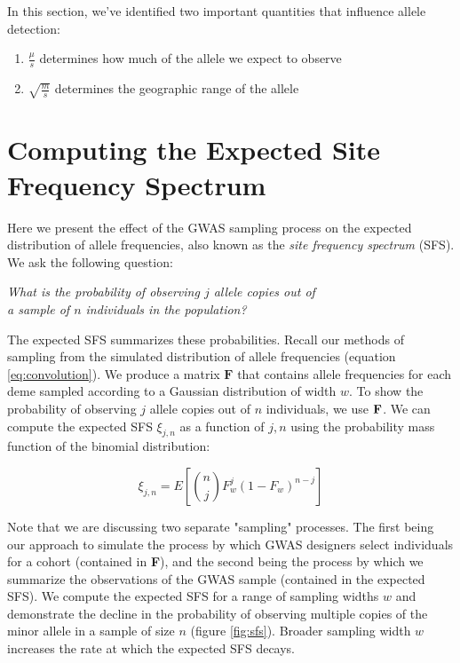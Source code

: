In this section, we've identified two important quantities that influence allele detection:

\begin{enumerate}
    \item $\frac{\mu}{s}$ determines how much of the allele we expect to observe
    \item $\sqrt{\frac{m}{s}}$ determines the geographic range of the allele
\end{enumerate}



\newpage
\section{Computing the Expected Site Frequency Spectrum}
Here we present the effect of the GWAS sampling process on the expected distribution of allele frequencies, also known as the \textit{site frequency spectrum} (SFS). We ask the following question:

\begin{center}
    \textit{What is the probability of observing $j$ allele copies out of \\
    a sample of $n$ individuals in the population?}
\end{center}

The expected SFS summarizes these probabilities. Recall our methods of sampling from the simulated distribution of allele frequencies (equation \ref{eq:convolution}). We produce a matrix $\textbf{F}$ that contains allele frequencies for each deme sampled according to a Gaussian distribution of width $w$. To show the probability of observing $j$ allele copies out of $n$ individuals, we use $\bf{F}$. We can compute the expected SFS $\xi_{j,n}$ as a function of $j,n$ using the probability mass function of the binomial distribution:

\begin{equation}\label{eq:sfs}
    \xi_{j,n} = E[{n \choose j} F_w^j(1-F_w)^{n-j}]
\end{equation}


Note that we are discussing two separate "sampling" processes. The first being our approach to simulate the process by which GWAS designers select individuals for a cohort (contained in \textbf{F}), and the second being the process by which we summarize the observations of the GWAS sample (contained in the expected SFS). We compute the expected SFS for a range of sampling widths $w$ and demonstrate the decline in the probability of observing multiple copies of the minor allele in a sample of size $n$ (figure \ref{fig:sfs}). Broader sampling width $w$ increases the rate at which the expected SFS decays. 


